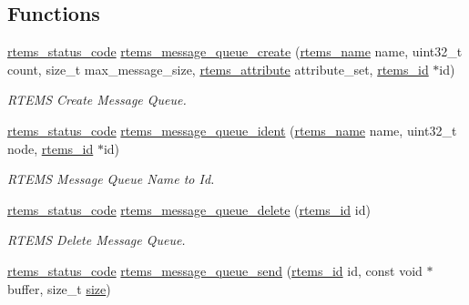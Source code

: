 \subsection*{Functions}
\begin{DoxyCompactItemize}
\item 
\mbox{\hyperlink{group__ClassicStatus_ga545d41846817eaba6143d52ee4d9e9fe}{rtems\+\_\+status\+\_\+code}} \mbox{\hyperlink{group__ClassicMessageQueue_gaea76fd325e8a84810f2be119448a307d}{rtems\+\_\+message\+\_\+queue\+\_\+create}} (\mbox{\hyperlink{group__ClassicTasks_ga55fb63c49f68c0cbd9bee004da15b1fd}{rtems\+\_\+name}} name, uint32\+\_\+t count, size\+\_\+t max\+\_\+message\+\_\+size, \mbox{\hyperlink{group__ClassicAttributes_gaea40313cf78ed843e09c4315d0a10f79}{rtems\+\_\+attribute}} attribute\+\_\+set, \mbox{\hyperlink{group__ClassicTasks_gab20892b814dced7dd4e5b9bf42becd57}{rtems\+\_\+id}} $\ast$id)
\begin{DoxyCompactList}\small\item\em R\+T\+E\+MS Create Message Queue. \end{DoxyCompactList}\item 
\mbox{\hyperlink{group__ClassicStatus_ga545d41846817eaba6143d52ee4d9e9fe}{rtems\+\_\+status\+\_\+code}} \mbox{\hyperlink{group__ClassicMessageQueue_ga8c7981cad697c7ab925362919b9af2f8}{rtems\+\_\+message\+\_\+queue\+\_\+ident}} (\mbox{\hyperlink{group__ClassicTasks_ga55fb63c49f68c0cbd9bee004da15b1fd}{rtems\+\_\+name}} name, uint32\+\_\+t node, \mbox{\hyperlink{group__ClassicTasks_gab20892b814dced7dd4e5b9bf42becd57}{rtems\+\_\+id}} $\ast$id)
\begin{DoxyCompactList}\small\item\em R\+T\+E\+MS Message Queue Name to Id. \end{DoxyCompactList}\item 
\mbox{\hyperlink{group__ClassicStatus_ga545d41846817eaba6143d52ee4d9e9fe}{rtems\+\_\+status\+\_\+code}} \mbox{\hyperlink{group__ClassicMessageQueue_ga4cf66620ef43543885708a1185b386ab}{rtems\+\_\+message\+\_\+queue\+\_\+delete}} (\mbox{\hyperlink{group__ClassicTasks_gab20892b814dced7dd4e5b9bf42becd57}{rtems\+\_\+id}} id)
\begin{DoxyCompactList}\small\item\em R\+T\+E\+MS Delete Message Queue. \end{DoxyCompactList}\item 
\mbox{\hyperlink{group__ClassicStatus_ga545d41846817eaba6143d52ee4d9e9fe}{rtems\+\_\+status\+\_\+code}} \mbox{\hyperlink{group__ClassicMessageQueue_ga24f00538a0bb3a18bc34f18824b34a09}{rtems\+\_\+message\+\_\+queue\+\_\+send}} (\mbox{\hyperlink{group__ClassicTasks_gab20892b814dced7dd4e5b9bf42becd57}{rtems\+\_\+id}} id, const void $\ast$buffer, size\+\_\+t \mbox{\hyperlink{sun4u_2tte_8h_a245260f6f74972558f61b85227df5aae}{size}})

\end{DoxyCompactItemize}
